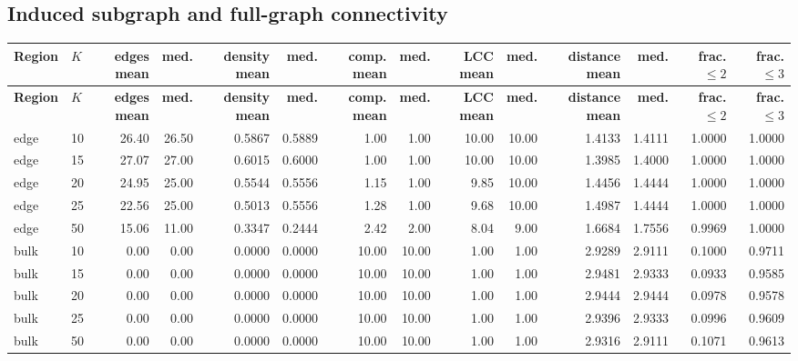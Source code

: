 \documentclass[10pt,letterpaper]{article}
\newcommand{\Hdr}[1]{\cellcolor{navy}\color{white}\bfseries #1}
\begin{document}
\subsection{Induced subgraph and full-graph connectivity}
\begin{longtable}{|l|l|r|r|r|r|r|r|r|r|r|r|r|r|}\hline
\Hdr{Region} & \Hdr{$K$} & \Hdr{edges mean} & \Hdr{med.} & \Hdr{density mean} & \Hdr{med.} & \Hdr{comp. mean} & \Hdr{med.} & \Hdr{LCC mean} & \Hdr{med.} & \Hdr{distance mean} & \Hdr{med.} & \Hdr{frac. $\le2$} & \Hdr{frac. $\le3$}\\\hline\endfirsthead
\hline \Hdr{Region} & \Hdr{$K$} & \Hdr{edges mean} & \Hdr{med.} & \Hdr{density mean} & \Hdr{med.} & \Hdr{comp. mean} & \Hdr{med.} & \Hdr{LCC mean} & \Hdr{med.} & \Hdr{distance mean} & \Hdr{med.} & \Hdr{frac. $\le2$} & \Hdr{frac. $\le3$}\\\hline\endhead
edge & 10 & 26.40 & 26.50 & 0.5867 & 0.5889 & 1.00 & 1.00 & 10.00 & 10.00 & 1.4133 & 1.4111 & 1.0000 & 1.0000 \\\hline
edge & 15 & 27.07 & 27.00 & 0.6015 & 0.6000 & 1.00 & 1.00 & 10.00 & 10.00 & 1.3985 & 1.4000 & 1.0000 & 1.0000 \\\hline
edge & 20 & 24.95 & 25.00 & 0.5544 & 0.5556 & 1.15 & 1.00 & 9.85 & 10.00 & 1.4456 & 1.4444 & 1.0000 & 1.0000 \\\hline
edge & 25 & 22.56 & 25.00 & 0.5013 & 0.5556 & 1.28 & 1.00 & 9.68 & 10.00 & 1.4987 & 1.4444 & 1.0000 & 1.0000 \\\hline
edge & 50 & 15.06 & 11.00 & 0.3347 & 0.2444 & 2.42 & 2.00 & 8.04 & 9.00 & 1.6684 & 1.7556 & 0.9969 & 1.0000 \\\hline
\hline
bulk & 10 & 0.00 & 0.00 & 0.0000 & 0.0000 & 10.00 & 10.00 & 1.00 & 1.00 & 2.9289 & 2.9111 & 0.1000 & 0.9711 \\\hline
bulk & 15 & 0.00 & 0.00 & 0.0000 & 0.0000 & 10.00 & 10.00 & 1.00 & 1.00 & 2.9481 & 2.9333 & 0.0933 & 0.9585 \\\hline
bulk & 20 & 0.00 & 0.00 & 0.0000 & 0.0000 & 10.00 & 10.00 & 1.00 & 1.00 & 2.9444 & 2.9444 & 0.0978 & 0.9578 \\\hline
bulk & 25 & 0.00 & 0.00 & 0.0000 & 0.0000 & 10.00 & 10.00 & 1.00 & 1.00 & 2.9396 & 2.9333 & 0.0996 & 0.9609 \\\hline
bulk & 50 & 0.00 & 0.00 & 0.0000 & 0.0000 & 10.00 & 10.00 & 1.00 & 1.00 & 2.9316 & 2.9111 & 0.1071 & 0.9613 \\\hline
\hline
\hline\end{longtable}
\endgroup
\setcounter{section}{8}
\end{document}
